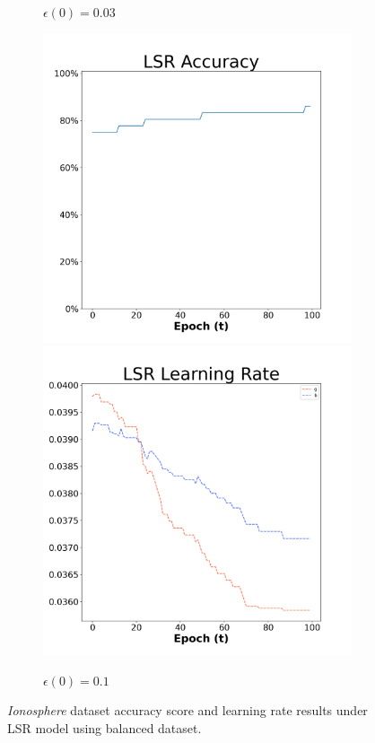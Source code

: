 \begin{figure}[H]
\begin{subfigure}{0.3\textwidth}
  \caption{$\epsilon(0)=0.03$}
\end{subfigure}\hfil %
\begin{subfigure}{0.3\textwidth}
  \includegraphics[width=\linewidth]{images/exper1/Ionosphere/LSR_0.1_acc.png}
  \includegraphics[width=\linewidth]{images/exper1/Ionosphere/LSR_0.1_lr.png}
  \caption{$\epsilon(0)=0.1$}
\end{subfigure}

\caption{\textit{Ionosphere} dataset accuracy score and learning rate results under LSR model using balanced dataset.}
\end{figure}

